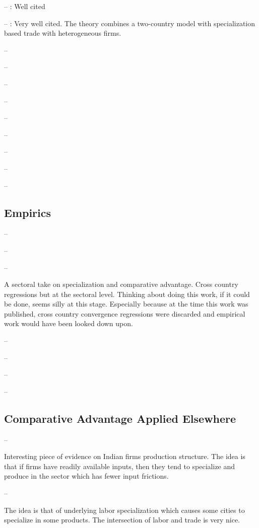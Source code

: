 \documentclass[12pt]{article}
\begin{document}
-- \cite{Grossman1990AER}: Well cited

-- \cite{Bernard2007RES}: Very well cited. The theory combines a two-country model with specialization based trade with heterogeneous firms.

-- \cite{Clarida1992AERPP}

-- \cite{Costinot2009E}

-- \cite{Deardorff1980JPE}

-- \cite{Deardorff2005RIE}

-- \cite{Costinot2009JIE}

-- \cite{Neary2007RES}

-- \cite{Keesing1966AER}

-- \cite{Redding1999OEP}

-- \cite{Matsuyama1992JET}

\subsection{Empirics}

-- \cite{Bernhofen2004JPE}

-- \cite{Costinot2012AERPP}

-- \cite{Levchenko2016JME}

A sectoral take on specialization and comparative advantage. Cross country regressions but at the sectoral level. Thinking about doing this work, if it could be done, seems silly at this stage. Especially because at the time this work was published, cross country convergence regressions were discarded and empirical work would have been looked down upon.

-- \cite{Golub2000RIE}

-- \cite{Chor2010JIE}

-- \cite{Hummels1993AERPP}

-- \cite{Hoen2006ARS}


\subsection{Comparative Advantage Applied Elsewhere}

-- \cite{Boehm2022JPE}

Interesting piece of evidence on Indian firms production structure. The idea is that if firms have readily available inputs, then they tend to specialize and produce in the sector which has fewer input frictions.

-- \cite{Davis2020JIE}

The idea is that of underlying labor specialization which causes some cities to specialize in some products. The intersection of labor and trade is very nice.
\end{document}
